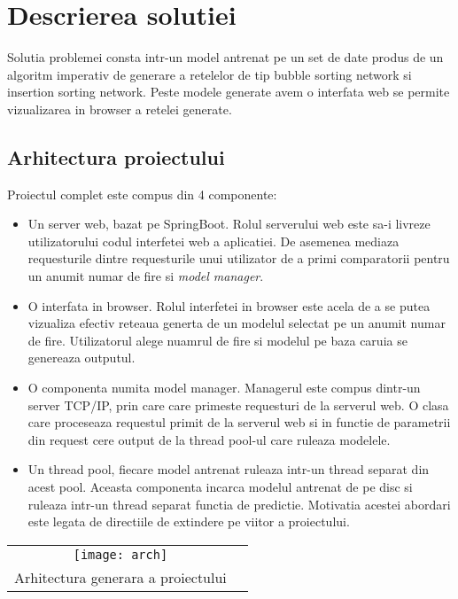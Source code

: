 \documentclass[12pt]{article}
\begin{document}
\section{Descrierea solutiei}
Solutia problemei consta intr-un model antrenat pe un set de date produs de un algoritm imperativ de generare a retelelor de tip bubble sorting network si insertion sorting network. Peste modele generate avem o interfata web se permite vizualizarea in browser a retelei generate.

\subsection{Arhitectura proiectului}

Proiectul complet este compus din 4 componente:
\begin{itemize}
	\item Un server web, bazat pe SpringBoot. Rolul serverului web este sa-i livreze utilizatorului codul interfetei web a aplicatiei. De asemenea mediaza requesturile dintre requesturile unui utilizator de a primi comparatorii pentru un anumit numar de fire si \textit{model manager}. 
	\item O interfata in browser. Rolul interfetei in browser este acela de a se putea vizualiza efectiv reteaua generta de un modelul selectat pe un anumit numar de fire. Utilizatorul alege nuamrul de fire si modelul pe baza caruia se genereaza outputul.
	\item O componenta numita model manager. Managerul este compus dintr-un server TCP/IP, prin care care primeste requesturi de la serverul web. O clasa care proceseaza requestul primit de la serverul web si in functie de parametrii din request cere output de la thread pool-ul care ruleaza modelele.
	\item Un thread pool, fiecare model antrenat ruleaza intr-un thread separat din acest pool. Aceasta componenta incarca modelul antrenat de pe disc si ruleaza intr-un thread separat functia de predictie. Motivatia acestei abordari este legata de directiile de extindere pe viitor a proiectului.
\end{itemize}


\begin{center}
\begin{tabular}{cc}
\texttt{[image: arch]} \\
Arhitectura generara a proiectului
\end{tabular}
\end{center}
\end{document}
